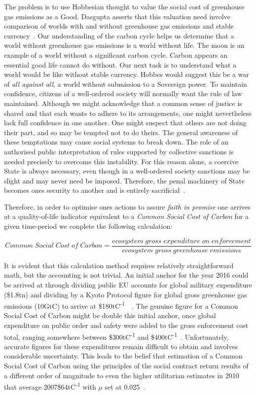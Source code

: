 \documentclass[11pt, oneside]{article}   	%
\begin{document}
The problem is to use Hobbesian thought to value the social cost of greenhouse gas emissions as a Good.
Dasgupta asserts that this valuation need involve comparison of worlds with and without greenhouse gas emissions and stable currency~\cite{pd2}.
Our understanding of the carbon cycle helps us determine that a world without greenhouse gas emissions is a world without life.
The moon is an example of a world without a significant carbon cycle.
Carbon appears an essential good life cannot do without.
Our next task is to understand what a world would be like without stable currency.
Hobbes would suggest this be a war of \emph{all against all}, a world without submission to a Sovereign power.
To maintain confidence, citizens of a well-ordered society will normally want the rule of law maintained.
Although we might acknowledge that a common sense of justice is shared and that each wants to adhere to its arrangements, one might nevertheless lack full confidence in one another.
One might suspect that others are not doing their part, and so may be tempted not to do theirs.
The general awareness of these temptations may cause social systems to break down.
The role of an authorised public interpretation of rules supported by collective sanctions is needed precisely to overcome this instability.
For this reason alone, a coercive State is always necessary, even though in a well-ordered society sanctions may be slight and may never need be imposed.
Therefore, the penal machinery of State becomes ones security to another and is entirely sacrificial~\cite{jr1}.\par

Therefore, in order to optimise ones actions to assure \emph{faith in promise} one arrives at a quality-of-life indicator equivalent to a \emph{Common Social Cost of Carbon} for a given time-period we conplete the following calculation:

\begin{equation}
Common\; Social\; Cost\; of\; Carbon = \frac{ecosystem\; gross\; expenditure\; on\; enforcement}{ecosystem\; gross\; greenhouse\; emissions}
\end{equation}

It is evident that this calculation method requires relatively straightforward math, but the accounting is not trivial.
An initial anchor for the year 2016 could be arrived at through dividing public EU accounts for global military expenditure (\$1.8tn) and dividing by a Kyoto Protocol figure for global gross greenhouse gas emissions (10GtC) to arrive at \$180tC\textsuperscript{-1}~\cite{eu1}~\cite{co1}.
The genuine figure for a Common Social Cost of Carbon might be double this initial anchor, once global expenditure on public order and safety were added to the gross enforcement cost total, ranging somewhere between \$300tC\textsuperscript{-1} and \$400tC\textsuperscript{-1}~\cite{oecd1}.
Unfortunately, accurate figures for these expenditures remain difficult to obtain and involves considerable uncertainty.
This leads to the belief that estimation of a Common Social Cost of Carbon using the principles of the social contract return results of a different order of magnitude to even the higher utilitarian estimates in 2010 that average 2007\$64tC\textsuperscript{-1}  with $\mu$ set at 0.025~\cite{iwg1}.
\end{document}
